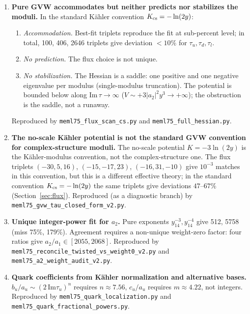 \documentclass[12pt,a4paper]{article}
\numberwithin{equation}{section}
\begin{document}
\begin{enumerate}[leftmargin=1.5em]
\item \textbf{Pure GVW accommodates but neither predicts nor
stabilizes the moduli.}
In the standard K\"ahler convention \(K_{\rm cs} = -\ln(2y)\):
\begin{enumerate}[label=(\alph*),leftmargin=2em]
\item \emph{Accommodation.} Best-fit triplets reproduce the fit at
sub-percent level; in total, 100, 406, 2646 triplets give deviation
\(<10\%\) for \(\tau_u, \tau_d, \tau_l\).
\item \emph{No prediction.} The flux choice is not unique.
\item \emph{No stabilization.} The Hessian is a saddle: one positive
and one negative eigenvalue per modulus (single-modulus truncation).
The potential is bounded below along \(\mathrm{Im}\,\tau\to\infty\)
(\(V\sim+3|a_2|^2y^3\to+\infty\)); the obstruction is the saddle,
not a runaway.
\end{enumerate}
Reproduced by \texttt{meml75\_flux\_scan\_cs.py} and
\texttt{meml75\_full\_hessian.py}.

\item \textbf{The no-scale K\"ahler potential is not the standard GVW
convention for complex-structure moduli.}
The no-scale potential \(K = -3\ln(2y)\) is the K\"ahler-modulus
convention, not the complex-structure one. The flux triplets
\((-30,5,16)\), \((-15,-17,23)\), \((-16,31,-10)\) give
\(10^{-3}\) matches in this convention, but this is a different
effective theory; in the standard convention \(K_{\rm cs} = -\ln(2y)\)
the same triplets give deviations \(47\)--\(67\%\)
(Section~\ref{sec:flux}). Reproduced (as a diagnostic branch)
by \texttt{meml75\_gvw\_tau\_closed\_form\_v2.py}.

\item \textbf{Unique integer-power fit for \(a_2\).}
Pure exponents \(y_{14}^{-3}, y_{14}^{-4}\) give 512, 5758 (miss
75\%, 179\%). Agreement requires a non-unique weight-zero factor:
four ratios give \(a_2/a_1 \in [2055, 2068]\). Reproduced by
\texttt{meml75\_reconcile\_twisted\_vs\_weight0\_v2.py} and
\texttt{meml75\_a2\_weight\_audit\_v2.py}.

\item \textbf{Quark coefficients from K\"ahler normalization and
alternative bases.} \(b_u/a_u\sim(2\,\mathrm{Im}\tau_u)^n\) requires
\(n\approx7.56\), \(c_u/a_u\) requires \(m\approx4.22\), not integers.
Reproduced by \texttt{meml75\_quark\_localization.py} and
\texttt{meml75\_quark\_fractional\_powers.py}.


\end{enumerate}
\end{document}
